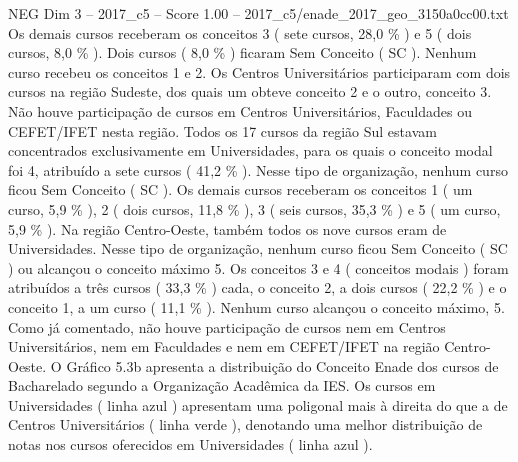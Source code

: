 \begin{textsample}{NEG Dim 3 – 2017\_c5 – Score 1.00 – 2017\_c5/enade\_2017\_geo\_3150a0cc00.txt}
Os demais cursos receberam os conceitos 3 ( sete cursos, 28,0 \% ) e 5 ( dois cursos, 8,0 \% ).
Dois cursos ( 8,0 \% ) ficaram Sem Conceito ( SC ).
Nenhum curso recebeu os conceitos 1 e 2.
Os Centros Universitários participaram com dois cursos na região Sudeste, dos quais um obteve conceito 2 e o outro, conceito 3.
Não houve participação de cursos em Centros Universitários, Faculdades ou CEFET/IFET nesta região.
Todos os 17 cursos da região Sul estavam concentrados exclusivamente em Universidades, para os quais o conceito modal foi 4, atribuído a sete cursos ( 41,2 \% ).
Nesse tipo de organização, nenhum curso ficou Sem Conceito ( SC ).
Os demais cursos receberam os conceitos 1 ( um curso, 5,9 \% ), 2 ( dois cursos, 11,8 \% ), 3 ( seis cursos, 35,3 \% ) e 5 ( um curso, 5,9 \% ).
Na região Centro-Oeste, também todos os nove cursos eram de Universidades.
Nesse tipo de organização, nenhum curso ficou Sem Conceito ( SC ) ou alcançou o conceito máximo 5.
Os conceitos 3 e 4 ( conceitos modais ) foram atribuídos a três cursos ( 33,3 \% ) cada, o conceito 2, a dois cursos ( 22,2 \% ) e o conceito 1, a um curso ( 11,1 \% ).
Nenhum curso alcançou o conceito máximo, 5.
Como já comentado, não houve participação de cursos nem em Centros Universitários, nem em Faculdades e nem em CEFET/IFET na região Centro-Oeste.
O Gráfico 5.3b apresenta a distribuição do Conceito Enade dos cursos de Bacharelado segundo a Organização Acadêmica da IES.
Os cursos em Universidades ( linha azul ) apresentam uma poligonal mais à direita do que a de Centros Universitários ( linha verde ), denotando uma melhor distribuição de notas nos cursos oferecidos em Universidades ( linha azul ).

\end{textsample}
